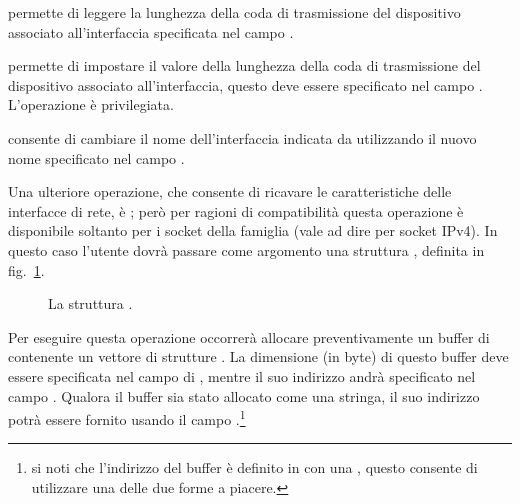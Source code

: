 \begin{basedescript}{\desclabelwidth{1.5cm}\desclabelstyle{\nextlinelabel}}
\item[\constd{SIOCGIFTXQLEN}] permette di leggere la lunghezza della coda di
  trasmissione del dispositivo associato all'interfaccia specificata nel campo
  .

\item[\constd{SIOCSIFTXQLEN}] permette di impostare il valore della lunghezza
  della coda di trasmissione del dispositivo associato all'interfaccia, questo
  deve essere specificato nel campo . L'operazione è
  privilegiata. 

\item[\constd{SIOCSIFNAME}] consente di cambiare il nome dell'interfaccia
  indicata da  utilizzando il nuovo nome specificato nel campo
  .

\end{basedescript}



Una ulteriore operazione, che consente di ricavare le caratteristiche delle
interfacce di rete, è ; però per ragioni di compatibilità
questa operazione è disponibile soltanto per i socket della famiglia
 (vale ad dire per socket IPv4). In questo caso l'utente dovrà
passare come argomento una struttura , definita in
fig.~\ref{fig:netdevice_ifconf_struct}.

\begin{figure}[!htb]
  \footnotesize \centering
  \begin{minipage}[c]{0.80\textwidth}
  \end{minipage}
  \caption{La struttura .}
  \label{fig:netdevice_ifconf_struct}
\end{figure}

Per eseguire questa operazione occorrerà allocare preventivamente un buffer di
contenente un vettore di strutture . La dimensione (in byte) di
questo buffer deve essere specificata nel campo  di
, mentre il suo indirizzo andrà specificato nel campo
. Qualora il buffer sia stato allocato come una stringa, il suo
indirizzo potrà essere fornito usando il campo .\footnote{si
  noti che l'indirizzo del buffer è definito in  con una
  , questo consente di utilizzare una delle due forme a piacere.}

